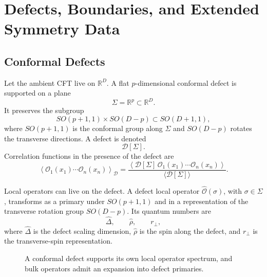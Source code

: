 \chapter{Defects, Boundaries, and Extended Symmetry Data}
\label{ch:volume-iii-defects-boundaries-extended-symmetry-data}

\section{Conformal Defects}

Let the ambient CFT live on \(\mathbb R^D\).  A flat \(p\)-dimensional
conformal defect is supported on a plane
\[
  \Sigma=\mathbb R^p\subset\mathbb R^D.
\]
It preserves the subgroup
\[
  SO(p+1,1)\times SO(D-p)
  \subset SO(D+1,1),
\]
where \(SO(p+1,1)\) is the conformal group along \(\Sigma\) and
\(SO(D-p)\) rotates the transverse directions.  A defect is denoted
\[
  \mathcal D[\Sigma].
\]
Correlation functions in the presence of the defect are
\[
  \left\langle
    \mathcal O_1(x_1)\cdots\mathcal O_n(x_n)
  \right\rangle_{\mathcal D}
  =
  \frac{
    \left\langle
      \mathcal D[\Sigma]\,
      \mathcal O_1(x_1)\cdots\mathcal O_n(x_n)
    \right\rangle
  }{\langle\mathcal D[\Sigma]\rangle}.
\]

Local operators can live on the defect.  A defect local operator
\(\widehat{\mathcal O}(\sigma)\), with \(\sigma\in\Sigma\), transforms as a
primary under \(SO(p+1,1)\) and in a representation of the transverse rotation
group \(SO(D-p)\).  Its quantum numbers are
\[
  \widehat\Delta,\qquad \widehat\rho,\qquad r_\perp,
\]
where \(\widehat\Delta\) is the defect scaling dimension,
\(\widehat\rho\) is the spin along the defect, and \(r_\perp\) is the
transverse-spin representation.

\begin{figure}[H]
  \centering
  \caption{A conformal defect supports its own local operator spectrum, and
  bulk operators admit an expansion into defect primaries.}
  \label{fig:bulk-to-defect-ope}
\end{figure}

